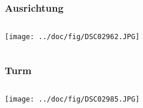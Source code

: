 \begin{frame}
    \frametitle{Ausrichtung}
    \begin{columns}
        \begin{column}{0.8\textwidth}
            \centering
            \texttt{[image: ../doc/fig/DSC02962.JPG]}
        \end{column}
    \end{columns}
\end{frame}
\begin{frame}
    \frametitle{Turm}
    \begin{columns}
        \begin{column}{0.8\textwidth}
            \centering
            \texttt{[image: ../doc/fig/DSC02985.JPG]}
        \end{column}
    \end{columns}
\end{frame}

